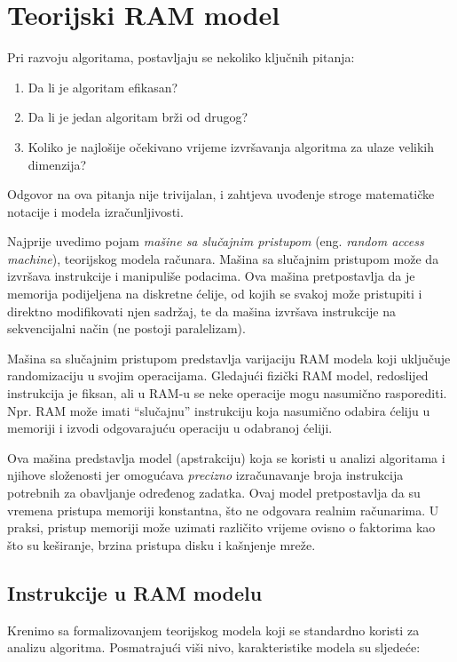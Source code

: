 \section{Teorijski RAM model}

Pri razvoju algoritama, postavljaju se nekoliko ključnih pitanja: 
\begin{enumerate}
	\item Da li je algoritam efikasan? 
	\item Da li je jedan algoritam brži od drugog? 
	\item Koliko je najlošije očekivano vrijeme izvršavanja algoritma za ulaze velikih dimenzija? 
\end{enumerate}
 

Odgovor na ova pitanja nije trivijalan, i zahtjeva uvođenje stroge matematičke notacije i modela izračunljivosti. 

Najprije uvedimo pojam \textit{mašine sa slučajnim pristupom} (eng. \textit{random access machine}), teorijskog modela računara.  Mašina sa slučajnim pristupom može da izvršava instrukcije i manipuliše podacima. Ova mašina pretpostavlja da je memorija  %
podijeljena na diskretne ćelije, od kojih se svakoj može pristupiti i direktno modifikovati njen sadržaj, te da mašina izvršava instrukcije na sekvencijalni način (ne postoji paralelizam).

Mašina sa slučajnim pristupom predstavlja varijaciju RAM modela koji uključuje randomizaciju u svojim operacijama. Gledajući fizički RAM model, redoslijed instrukcija je fiksan, ali u RAM-u se neke operacije mogu nasumično rasporediti. Npr. RAM može imati ``slučajnu''  instrukciju koja nasumično odabira ćeliju u memoriji i izvodi odgovarajuću operaciju u odabranoj ćeliji.

Ova mašina predstavlja model (apstrakciju) koja se koristi u analizi algoritama i njihove složenosti jer omogućava \textit{precizno} izračunavanje broja instrukcija potrebnih za obavljanje određenog zadatka. Ovaj model pretpostavlja da su vremena pristupa memoriji konstantna, što ne odgovara  realnim računarima. U praksi, pristup memoriji može uzimati različito vrijeme ovisno o faktorima kao što su keširanje, brzina pristupa disku i kašnjenje mreže.

\subsection{Instrukcije u RAM modelu}
Krenimo sa formalizovanjem teorijskog modela koji 
se standardno koristi za analizu algoritma.  Posmatrajući viši nivo,   karakteristike modela su sljedeće:

